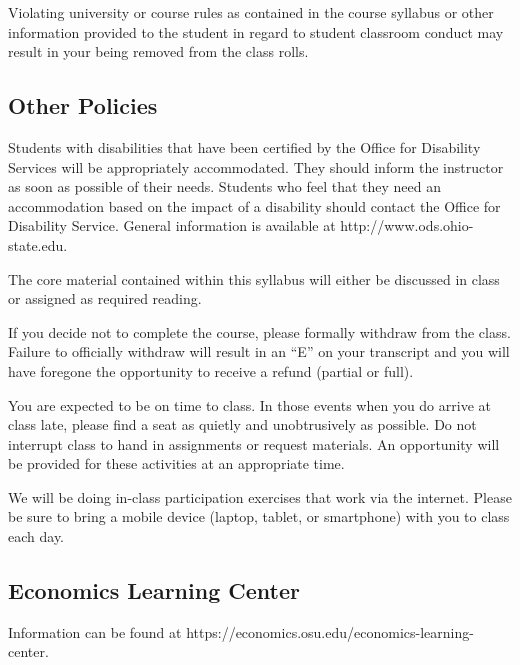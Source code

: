 \documentclass[12pt]{article}
\begin{document}
Violating university or course rules as contained in the course syllabus or other information provided to the student in regard to student classroom conduct may result in your being removed from the class rolls.

\subsection*{Other Policies}

Students with disabilities that have been certified by the Office for Disability Services will be appropriately accommodated.
They should inform the instructor as soon as possible of their needs.
Students who feel that they need an accommodation based on the impact of a disability should contact the Office for Disability Service.
General information is available at http://www.ods.ohio-state.edu.

The core material contained within this syllabus will either be discussed in class or assigned as required reading.

If you decide not to complete the course, please formally withdraw from the class.
Failure to officially withdraw will result in an ``E'' on your transcript and you will have foregone the opportunity to receive a refund (partial or full).

You are expected to be on time to class.
In those events when you do arrive at class late, please find a seat as quietly and unobtrusively as possible.
Do not interrupt class to hand in assignments or request materials.
An opportunity will be provided for these activities at an appropriate time.

We will be doing in-class participation exercises that work via the internet.
Please be sure to bring a mobile device (laptop, tablet, or smartphone) with you to class each day.

\subsection*{Economics Learning Center}

Information can be found at https://economics.osu.edu/economics-learning-center.
\end{document}
